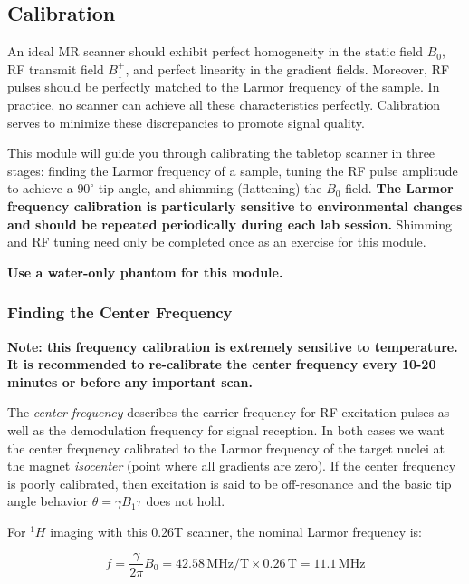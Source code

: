 \newpage
\subsection{Calibration}

An ideal MR scanner should exhibit perfect homogeneity in the static field $B_0$, RF transmit field $B_1^+$, and perfect linearity in the gradient fields. Moreover, RF pulses should be perfectly matched to the Larmor frequency of the sample. In practice, no scanner can achieve all these characteristics perfectly. Calibration serves to minimize these discrepancies to promote signal quality.

This module will guide you through calibrating the tabletop scanner in three stages: finding the Larmor frequency of a sample, tuning the RF pulse amplitude to achieve a $90^{\circ}$ tip angle, and shimming (flattening) the $B_0$ field. \textbf{The Larmor frequency calibration is particularly sensitive to environmental changes and should be repeated periodically during each lab session.} Shimming and RF tuning need only be completed once as an exercise for this module.

\textbf{Use a water-only phantom for this module.}

\subsubsection{Finding the Center Frequency} \label{sec:center}

\noindent{}\textbf{Note: this frequency calibration is extremely sensitive to temperature. It is recommended to re-calibrate the center frequency every 10-20 minutes or before any important scan.}
\vspace{3mm}

The \emph{center frequency} describes the carrier frequency for RF excitation pulses as well as the demodulation frequency for signal reception. In both cases we want the center frequency calibrated to the Larmor frequency of the target nuclei at the magnet \emph{isocenter} (point where all gradients are zero). If the center frequency is poorly calibrated, then excitation is said to be off-resonance and the basic tip angle behavior $\theta = \gamma B_1 \tau$ does not hold.

For $^1 H$ imaging with this 0.26T scanner, the nominal Larmor frequency is: 

$$ f = \frac{\gamma}{2\pi} B_0 = 42.58\,\text{MHz/T} \times 0.26\,\text{T} = 11.1\,\text{MHz} $$

